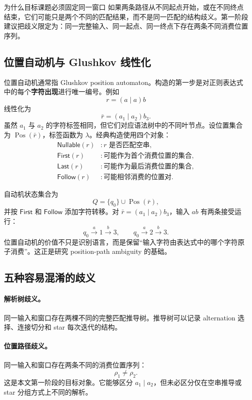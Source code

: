 \documentclass[UTF8,a4paper,12pt]{ctexart}
\begin{document}
\begin{conceptbox}{为什么目标课题必须固定同一窗口}
如果两条路径从不同起点开始，或在不同终点结束，它们可能只是两个不同的匹配结果，而不是同一匹配的结构歧义。第一阶段建议把歧义限定为：同一完整输入、同一起点、同一终点下存在两条不同消费位置序列。
\end{conceptbox}

\subsection{位置自动机与 Glushkov 线性化}

位置自动机通常指 Glushkov position automaton。构造的第一步是对正则表达式中的每个\textbf{字符出现}进行唯一编号。例如
\[
r=(a\mid a)b
\]
线性化为
\[
\bar r=(a_1\mid a_2)b_3.
\]
虽然 $a_1$ 与 $a_2$ 的字符标签相同，但它们对应语法树中的不同叶节点。设位置集合为 $\operatorname{Pos}(\bar r)$，标签函数为 $\lambda$。经典构造使用四个对象：
\begin{align*}
\mathsf{Nullable}(r)&:\text{$r$ 是否匹配空串},\\
\mathsf{First}(r)&:\text{可能作为首个消费位置的集合},\\
\mathsf{Last}(r)&:\text{可能作为最后消费位置的集合},\\
\mathsf{Follow}(r)&:\text{可能相邻消费的位置对}.
\end{align*}

自动机状态集合为
\[
Q=\{q_0\}\cup\operatorname{Pos}(\bar r),
\]
并按 $\mathsf{First}$ 和 $\mathsf{Follow}$ 添加字符转移。对 $\bar r=(a_1\mid a_2)b_3$，输入 $ab$ 有两条接受运行：
\[
q_0\xrightarrow{a}1\xrightarrow{b}3,
\qquad
q_0\xrightarrow{a}2\xrightarrow{b}3.
\]
位置自动机的价值不只是识别语言，而是保留“输入字符由表达式中的哪个字符原子消费”。这正是研究 position-path ambiguity 的基础。

\subsection{五种容易混淆的歧义}

\paragraph{解析树歧义。}
同一输入和窗口存在两棵不同的完整匹配推导树。推导树可以记录 alternation 选择、连接切分和 star 每次迭代的结构。

\paragraph{位置路径歧义。}
同一输入和窗口存在两条不同的消费位置序列：
\[
\rho_1\neq\rho_2.
\]
这是本文第一阶段的目标对象。它能够区分 $a_1\mid a_2$，但未必区分仅在空串推导或 star 分组方式上不同的解析。
\end{document}
